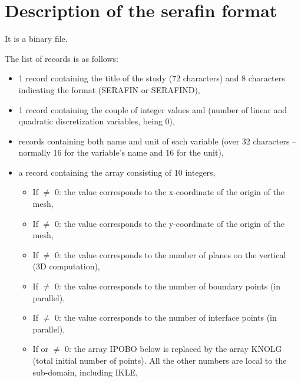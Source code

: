\chapter{Description of the serafin format}
\label{sec:srffmt}
It is a binary file.

The list of records is as follows:

\begin{itemize}
\item 1 record containing the title of the study (72 characters) and 8
characters indicating the format (SERAFIN or SERAFIND),

\item 1 record containing the couple of integer values 
and  (number of linear and quadratic discretization
variables,  being 0),

\item {} records containing both name and unit of each
variable (over 32 characters -- normally 16 for the variable's name and 16 for
the unit),

\item a record containing the  array consisting of 10 integers,

\begin{itemize}

\item If  $\neq$ 0: the value corresponds to the
x-coordinate of the origin of the mesh,

\item If  $\neq$ 0: the value corresponds to the
y-coordinate of the origin of the mesh,

\item If  $\neq$ 0: the value corresponds to the
number of planes on the vertical (3D computation),

\item If  $\neq$ 0: the value corresponds to the
number of boundary points (in parallel),

\item If  $\neq$ 0: the value corresponds to the
number of interface points (in parallel),

\item If  or  $\neq$ 0: the
array IPOBO below is replaced by the array KNOLG (total initial number of
points). All the other numbers are local to the sub-domain, including IKLE,


\end{itemize}
\end{itemize}
